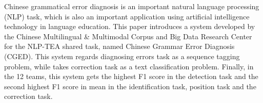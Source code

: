 Chinese grammatical error diagnosis is an important natural language processing (NLP) task, which is also an important application using artificial intelligence technology in language education. This paper introduces a system developed by the Chinese Multilingual \& Multimodal Corpus and Big Data Research Center for the NLP-TEA shared task, named Chinese Grammar Error Diagnosis (CGED). This system regards diagnosing errors task as a sequence tagging problem, while takes correction task as a text classification problem. Finally, in the 12 teams, this system gets the highest F1 score in the detection task and the second highest F1 score in mean in the identification task, position task and the correction task.
